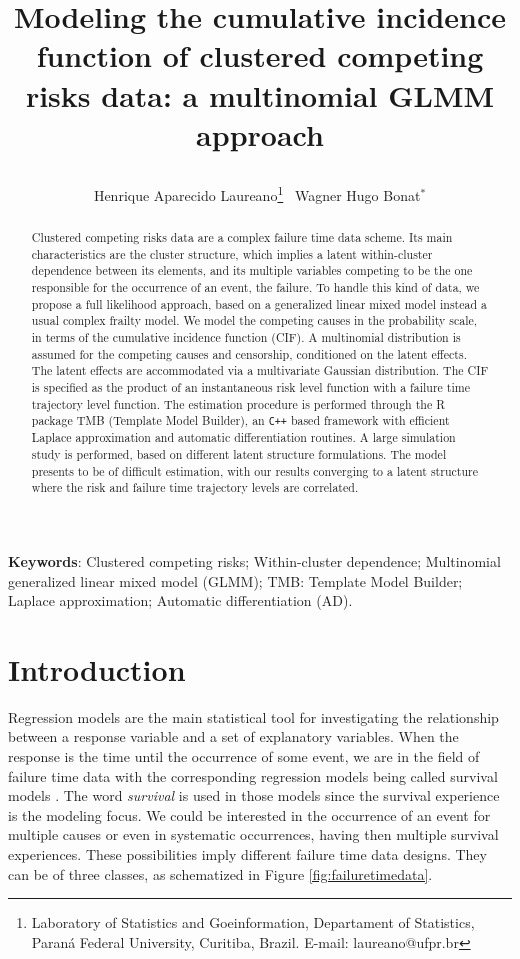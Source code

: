 \documentclass[a4paper,12pt]{article}
\title{
  
  Modeling the cumulative incidence function of clustered competing
  risks data: a multinomial GLMM approach

}
\author{
  Henrique Aparecido Laureano\thanks{
    Laboratory of Statistics and Goeinformation,
    Departament of Statistics,
    Paran\'{a} Federal University, Curitiba, Brazil.
    E-mail: laureano@ufpr.br
  }~
  Wagner Hugo Bonat$^\ast$}
\begin{document}
\maketitle

\begin{abstract}

  Clustered competing risks data are a complex failure time data
  scheme. Its main characteristics are the cluster structure, which
  implies a latent within-cluster dependence between its elements, and
  its multiple variables competing to be the one responsible for the
  occurrence of an event, the failure. To handle this kind of data, we
  propose a full likelihood approach, based on a generalized linear
  mixed model instead a usual complex frailty model. We model the
  competing causes in the probability scale, in terms of the cumulative
  incidence function (CIF). A multinomial distribution is assumed for
  the competing causes and censorship, conditioned on the latent
  effects. The latent effects are accommodated via a multivariate
  Gaussian distribution. The CIF is specified as the product of an
  instantaneous risk level function with a failure time trajectory level
  function. The estimation procedure is performed through the R package
  TMB (Template Model Builder), an \texttt{C++} based framework with
  efficient Laplace approximation and automatic differentiation
  routines. A large simulation study is performed, based on different
  latent structure formulations. The model presents to be of difficult
  estimation, with our results converging to a latent structure where
  the risk and failure time trajectory levels are correlated.

\end{abstract}

\begin{flushleft}
 \textbf{Keywords}: 
 Clustered competing risks;
 Within-cluster dependence;
 Multinomial generalized linear mixed model (GLMM);
 TMB: Template Model Builder;
 Laplace approximation;
 Automatic differentiation (AD).                    
\end{flushleft}

\section{Introduction}

Regression models are the main statistical tool for investigating the
relationship between a response variable and a set of explanatory
variables. When the response is the time until the occurrence of some
event, we are in the field of failure time data with the corresponding
regression models being called survival models
\citep{kalb&prentice}. The word \textit{survival} is used in those
models since the survival experience is the modeling focus. We could be
interested in the occurrence of an event for multiple causes or even in
systematic occurrences, having then multiple survival experiences. These
possibilities imply different failure time data designs. They can be of
three classes, as schematized in Figure \ref{fig:failuretimedata}.
\end{document}
